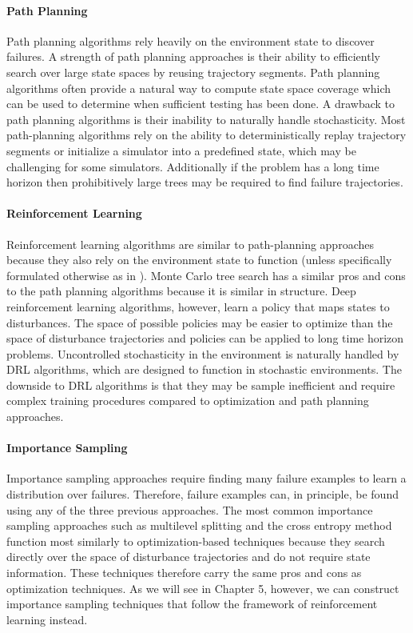 \paragraph{Path Planning} Path planning algorithms rely heavily on the environment state to discover failures. A strength of path planning approaches is their ability to efficiently search over large state spaces by reusing trajectory segments. Path planning algorithms often provide a natural way to compute state space coverage which can be used to determine when sufficient testing has been done. A drawback to path planning algorithms is their inability to naturally handle stochasticity. Most path-planning algorithms rely on the ability to deterministically replay trajectory segments or initialize a simulator into a predefined state, which may be challenging for some simulators.  Additionally if the problem has a long time horizon then prohibitively large trees may be required to find failure trajectories. 


\paragraph{Reinforcement Learning} Reinforcement learning algorithms are similar to path-planning approaches because they also rely on the environment state to function (unless specifically formulated otherwise as in \textcite{koren2019adaptive}). Monte Carlo tree search has a similar pros and cons to the path planning algorithms because it is similar in structure. Deep reinforcement learning algorithms, however, learn a policy that maps states to disturbances. The space of possible policies may be easier to optimize than the space of disturbance trajectories and policies can be applied to long time horizon problems. Uncontrolled stochasticity in the environment is naturally handled by DRL algorithms, which are designed to function in stochastic environments. The downside to DRL algorithms is that they may be sample inefficient and require complex training procedures compared to optimization and path planning approaches. 


\paragraph{Importance Sampling}
Importance sampling approaches require finding many failure examples to learn a distribution over failures. Therefore, failure examples can, in principle, be found using any of the three previous approaches. The most common importance sampling approaches such as multilevel splitting and the cross entropy method function most similarly to optimization-based techniques because they search directly over the space of disturbance trajectories and do not require state information. These techniques therefore carry the same pros and cons as optimization techniques. As we will see in Chapter 5, however, we can construct importance sampling techniques that follow the framework of reinforcement learning instead. 

